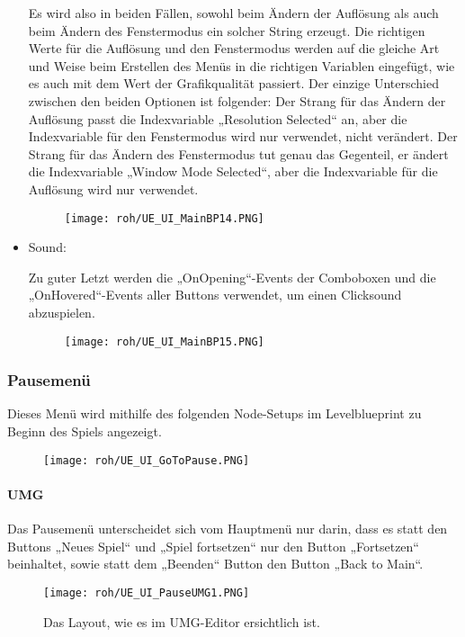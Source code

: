 \begin{itemize}
    Es wird also in beiden Fällen, sowohl beim Ändern der Auflösung als auch beim Ändern des Fenstermodus ein solcher String erzeugt.
    Die richtigen Werte für die Auflösung und den Fenstermodus werden auf die gleiche Art und Weise beim Erstellen des Menüs in die richtigen Variablen eingefügt, wie es auch mit dem Wert der Grafikqualität passiert.
    Der einzige Unterschied zwischen den beiden Optionen ist folgender: Der Strang für das Ändern der Auflösung passt die Indexvariable „Resolution Selected“ an, aber die Indexvariable für den Fenstermodus wird nur verwendet, nicht verändert. Der Strang für das Ändern des Fenstermodus tut genau das Gegenteil, er ändert die Indexvariable „Window Mode Selected“, aber die Indexvariable für die Auflösung wird nur verwendet.
    \begin{figure}[H]
        \centering
        \texttt{[image: roh/UE\_UI\_MainBP14.PNG]}
        \label{UE:UI_MainBP14}
    \end{figure}
    \item Sound:

    Zu guter Letzt werden die „OnOpening“-Events der Comboboxen und die „OnHovered“-Events aller Buttons verwendet, um einen Clicksound abzuspielen.
    \begin{figure}[H]
        \centering
        \texttt{[image: roh/UE\_UI\_MainBP15.PNG]}
        \label{UE:UI_MainBP15}
    \end{figure}
\end{itemize}
\subsubsection{Pausemenü}
Dieses Menü wird mithilfe des folgenden Node-Setups im Levelblueprint zu Beginn des Spiels angezeigt.
\begin{figure}[H]
    \centering
    \texttt{[image: roh/UE\_UI\_GoToPause.PNG]}
    \label{UE:UI_GoToPause}
\end{figure}
\paragraph{UMG}
Das Pausemenü unterscheidet sich vom Hauptmenü nur darin, dass es statt den Buttons „Neues Spiel“ und „Spiel fortsetzen“ nur den Button „Fortsetzen“ beinhaltet, sowie statt dem „Beenden“ Button den Button „Back to Main“.
\begin{figure}[H]
    \centering
    \texttt{[image: roh/UE\_UI\_PauseUMG1.PNG]}
    \caption{Das Layout, wie es im UMG-Editor ersichtlich ist.}
    \label{UE:UI_PauseUMG1}
\end{figure}

